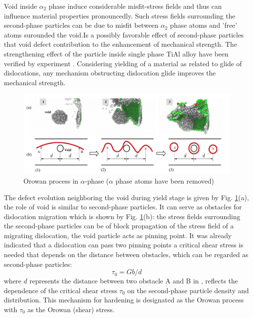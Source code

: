 \documentclass[Unknown,article,submit,moreauthors,pdftex,10pt,a4paper]{Definitions/mdpi}
\begin{document}
Void inside $\alpha_2$ phase induce considerable misfit-stress fields and thus can influence material properties pronouncedly. Such stress fields surrounding the second-phase particles can be due to misfit between $\alpha_2$ phase atoms and 'free' atoms surounded the void.Is a possibly favorable effect of second-phase particles that void defect contribution to the enhancement of mechanical strength. The strengthening effect of the particle inside single phase TiAl alloy have been verified by experiment \cite{Zghal1998}. Considering yielding of a material as related to glide of dislocations, any mechanism obstructing dislocation glide improves the mechanical strength. 

\begin{figure}[ht]
	\centering
	\includegraphics[width=1\linewidth]{"img/orowan"}
	\caption{Orowan process in $\alpha$-phase ($\alpha$ phase atoms have been removed)}
	\label{fig:orowan}
\end{figure}

The defect evolution neighboring the void during yield stage is given by Fig. \ref{fig:orowan}(a), the role of void is similar to second-phase particles. It can serve as obstacles for dislocation migration which is shown by Fig. \ref{fig:orowan}(b): the stress fields surrounding the second-phase particles can be of block propagation of the stress field of a migrating dislocation, the void particle acts as pinning point. It was already indicated that a dislocation can pass two pinning points a critical shear stress is needed that depends on the distance between  obstacles, which can be regarded as second-phase particles\cite{Xiong2015}:
\begin{equation} \label{eq:orowan} 
\tau_0 = Gb/d
\end{equation}
where $d$ represents the distance between two obstacle A and B in , reflects the dependence of the critical shear stress $\tau_0$ on the second-phase particle density and distribution. This mechanism for hardening is designated as the Orowan process with $\tau_0$ as the Orowan (shear) stress.
\end{document}

